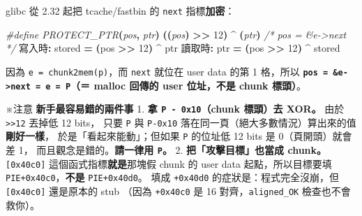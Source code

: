 \documentclass[10pt,a4paper]{article}
\newenvironment{Shaded}{\begin{snugshade}}{\end{snugshade}}
\newcommand{\CommentTok}[1]{\textcolor[rgb]{0.56,0.35,0.01}{\textit{#1}}}
\newcommand{\DecValTok}[1]{\textcolor[rgb]{0.00,0.00,0.81}{#1}}
\newcommand{\NormalTok}[1]{#1}
\newcommand{\OperatorTok}[1]{\textcolor[rgb]{0.81,0.36,0.00}{\textbf{#1}}}
\newcommand{\PreprocessorTok}[1]{\textcolor[rgb]{0.56,0.35,0.01}{\textit{#1}}}
\renewenvironment{Shaded}{%
  \def\FrameCommand{\fboxsep=3.2pt\colorbox{shadecolor}}%
  \MakeFramed{\advance\hsize-\width\FrameRestore\small}%
}{%
  \endMakeFramed
}
\renewenvironment{quote}{%
  \begin{mdframed}[linewidth=0pt,innerleftmargin=0pt,innerrightmargin=0pt,
    innerbottommargin=0pt,innertopmargin=0pt,skipabove=0.55em,skipbelow=0.55em,
    leftmargin=0.9em,rightmargin=0.4em,startcode={\color{quotebar}\vrule width 2.6pt},%
    endcode={}]%
  \itshape\color{black}%
}{%
  \end{mdframed}%
}
\begin{document}
glibc 從 2.32 起把 tcache/fastbin 的 \texttt{next} 指標\textbf{加密}：

\begin{Shaded}
\begin{Highlighting}[]
\PreprocessorTok{\#define PROTECT\_PTR}\OperatorTok{(}\PreprocessorTok{pos}\OperatorTok{,}\PreprocessorTok{ ptr}\OperatorTok{)}\PreprocessorTok{  }\OperatorTok{((}\PreprocessorTok{pos}\OperatorTok{)}\PreprocessorTok{ }\OperatorTok{\textgreater{}\textgreater{}}\PreprocessorTok{ }\DecValTok{12}\OperatorTok{)}\PreprocessorTok{ }\OperatorTok{\^{}}\PreprocessorTok{ }\OperatorTok{(}\PreprocessorTok{ptr}\OperatorTok{)}\PreprocessorTok{    }\CommentTok{/* pos = \&e{-}\textgreater{}next */}
\NormalTok{寫入時}\OperatorTok{:}\NormalTok{ stored }\OperatorTok{=} \OperatorTok{(}\NormalTok{pos }\OperatorTok{\textgreater{}\textgreater{}} \DecValTok{12}\OperatorTok{)} \OperatorTok{\^{}}\NormalTok{ ptr}
\NormalTok{讀取時}\OperatorTok{:}\NormalTok{ ptr    }\OperatorTok{=} \OperatorTok{(}\NormalTok{pos }\OperatorTok{\textgreater{}\textgreater{}} \DecValTok{12}\OperatorTok{)} \OperatorTok{\^{}}\NormalTok{ stored}
\end{Highlighting}
\end{Shaded}

因為 \texttt{e\ \allowbreak{}=\ \allowbreak{}chunk2mem(p)}，而 \texttt{next} 就位在 user data 的第
1 格，所以
\textbf{\texttt{pos\ \allowbreak{}=\ \allowbreak{}\&\allowbreak{}e-\allowbreak{}\textgreater{}\allowbreak{}next\ \allowbreak{}=\ \allowbreak{}e\ \allowbreak{}=\ \allowbreak{}P}（＝ malloc
回傳的 user 位址，不是 chunk 標頭）}。

\begin{quote}
※注意 \textbf{新手最容易錯的兩件事} 1. \textbf{拿
\texttt{P\ \allowbreak{}-\allowbreak{}\ \allowbreak{}0x10}（chunk 標頭）去 XOR。} 由於
\texttt{\textgreater{}\allowbreak{}\textgreater{}\allowbreak{}12} 丟掉低 12 bits， 只要 \texttt{P}
與 \texttt{P-\allowbreak{}0x10}
落在同一頁（絕大多數情況）算出來的值\textbf{剛好一樣}，
於是「看起來能動」；但如果 \texttt{P} 的位址低 12 bits 是
0（頁開頭）就會差 1， 而且觀念是錯的。\textbf{請一律用 \texttt{P}。} 2.
\textbf{把「攻擊目標」也當成 chunk。} \texttt{{[}0x40c0{]}}
這個函式指標\textbf{就是}那塊假 chunk 的 user data 起點，所以目標要填
\texttt{PIE+0x40c0}，\textbf{不是} \texttt{PIE+0x40d0}。 填成
\texttt{+0x40d0} 的症狀是：程式完全沒崩，但 \texttt{{[}0x40c0{]}}
還是原本的 stub （因為 \texttt{+0x40c0} 是 16 對齊，\texttt{aligned\_\allowbreak{}OK}
檢查也不會救你）。
\end{quote}
\end{document}
